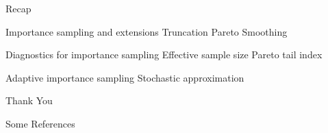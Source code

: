 \documentclass[14pt]{beamer}
\begin{document}
\begin{frame}{Recap}
    \begin{outline}
        \1 Importance sampling and extensions
            \2 Truncation
            \2 Pareto Smoothing \newline
        
        \1 Diagnostics for importance sampling
            \2 Effective sample size
            \2 Pareto tail index \newline

        \1 Adaptive importance sampling
            \2 Stochastic approximation
    \end{outline}
\end{frame}





\begin{frame}
    \centering
    \Huge Thank You
\end{frame}

\begin{frame}{Some References}
    
    
\end{frame}
\end{document}
